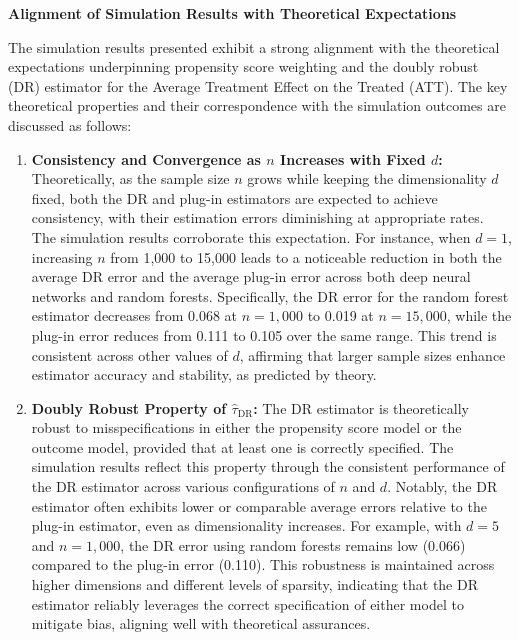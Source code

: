 \documentclass{article}
\begin{document}
\textbf{Alignment of Simulation Results with Theoretical Expectations}

The simulation results presented exhibit a strong alignment with the theoretical expectations underpinning propensity score weighting and the doubly robust (DR) estimator for the Average Treatment Effect on the Treated (ATT). The key theoretical properties and their correspondence with the simulation outcomes are discussed as follows:

\begin{enumerate}
    \item \textbf{Consistency and Convergence as \( n \) Increases with Fixed \( d \):} 
    Theoretically, as the sample size \( n \) grows while keeping the dimensionality \( d \) fixed, both the DR and plug-in estimators are expected to achieve consistency, with their estimation errors diminishing at appropriate rates. The simulation results corroborate this expectation. For instance, when \( d = 1 \), increasing \( n \) from 1,000 to 15,000 leads to a noticeable reduction in both the average DR error and the average plug-in error across both deep neural networks and random forests. Specifically, the DR error for the random forest estimator decreases from 0.068 at \( n = 1,000 \) to 0.019 at \( n = 15,000 \), while the plug-in error reduces from 0.111 to 0.105 over the same range. This trend is consistent across other values of \( d \), affirming that larger sample sizes enhance estimator accuracy and stability, as predicted by theory.

    \item \textbf{Doubly Robust Property of \( \hat{\tau}_{\text{DR}} \):}
    The DR estimator is theoretically robust to misspecifications in either the propensity score model or the outcome model, provided that at least one is correctly specified. The simulation results reflect this property through the consistent performance of the DR estimator across various configurations of \( n \) and \( d \). Notably, the DR estimator often exhibits lower or comparable average errors relative to the plug-in estimator, even as dimensionality increases. For example, with \( d = 5 \) and \( n = 1,000 \), the DR error using random forests remains low (0.066) compared to the plug-in error (0.110). This robustness is maintained across higher dimensions and different levels of sparsity, indicating that the DR estimator reliably leverages the correct specification of either model to mitigate bias, aligning well with theoretical assurances.


\end{enumerate}
\end{document}
